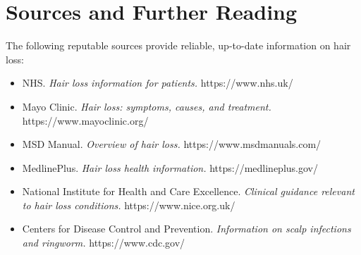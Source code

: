 \section*{Sources and Further Reading}
The following reputable sources provide reliable, up-to-date information on hair loss:

\begin{itemize}
    \item NHS. \textit{Hair loss information for patients.} https://www.nhs.uk/
    \item Mayo Clinic. \textit{Hair loss: symptoms, causes, and treatment.} https://www.mayoclinic.org/
    \item MSD Manual. \textit{Overview of hair loss.} https://www.msdmanuals.com/
    \item MedlinePlus. \textit{Hair loss health information.} https://medlineplus.gov/
    \item National Institute for Health and Care Excellence. \textit{Clinical guidance relevant to hair loss conditions.} https://www.nice.org.uk/
    \item Centers for Disease Control and Prevention. \textit{Information on scalp infections and ringworm.} https://www.cdc.gov/
\end{itemize}

